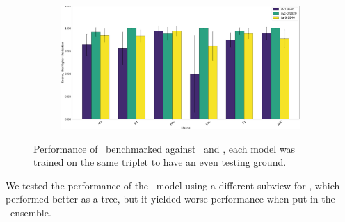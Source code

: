 \begin{figure}
\begin{subfigure}{0.5\linewidth}
		\subcaption{\an, \cnmod, \phin}
	\end{subfigure}
	\begin{subfigure}{0.5\linewidth}
		\includegraphics[width=\linewidth]{img/Bn_Cnmod_Phi_ta.png}
		\subcaption{\bn, \cnmod, \phin}
	\end{subfigure}
	\caption{Performance of \tas\ benchmarked against \rfs\ and \svcs, each model was trained on
		the same triplet to have an even testing ground.} \label{fig:triplets-performance}
\end{figure}

We tested the performance of the \ta\ model using a different subview for \cnmod, which performed
better as a tree, but it yielded worse performance when put in the \ta\ ensemble.



